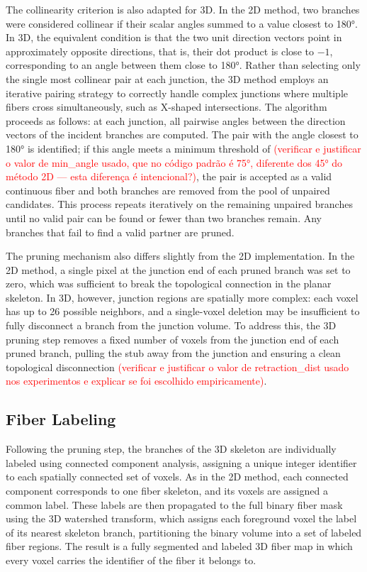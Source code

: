The collinearity criterion is also adapted for 3D. In the 2D method, two branches were considered collinear if their scalar angles summed to a value closest to 180°. In 3D, the equivalent condition is that the two unit direction vectors point in approximately opposite directions, that is, their dot product is close to $-1$, corresponding to an angle between them close to 180°. Rather than selecting only the single most collinear pair at each junction, the 3D method employs an iterative pairing strategy to correctly handle complex junctions where multiple fibers cross simultaneously, such as X-shaped intersections. The algorithm proceeds as follows: at each junction, all pairwise angles between the direction vectors of the incident branches are computed. The pair with the angle closest to 180° is identified; if this angle meets a minimum threshold of \textcolor{red}{(verificar e justificar o valor de min\_angle usado, que no código padrão é 75°, diferente dos 45° do método 2D --- esta diferença é intencional?)}, the pair is accepted as a valid continuous fiber and both branches are removed from the pool of unpaired candidates. This process repeats iteratively on the remaining unpaired branches until no valid pair can be found or fewer than two branches remain. Any branches that fail to find a valid partner are pruned.

The pruning mechanism also differs slightly from the 2D implementation. In the 2D method, a single pixel at the junction end of each pruned branch was set to zero, which was sufficient to break the topological connection in the planar skeleton. In 3D, however, junction regions are spatially more complex: each voxel has up to 26 possible neighbors, and a single-voxel deletion may be insufficient to fully disconnect a branch from the junction volume. To address this, the 3D pruning step removes a fixed number of voxels from the junction end of each pruned branch, pulling the stub away from the junction and ensuring a clean topological disconnection \textcolor{red}{(verificar e justificar o valor de retraction\_dist usado nos experimentos e explicar se foi escolhido empiricamente)}.

\subsection{Fiber Labeling}

Following the pruning step, the branches of the 3D skeleton are individually labeled using connected component analysis, assigning a unique integer identifier to each spatially connected set of voxels. As in the 2D method, each connected component corresponds to one fiber skeleton, and its voxels are assigned a common label. These labels are then propagated to the full binary fiber mask using the 3D watershed transform, which assigns each foreground voxel the label of its nearest skeleton branch, partitioning the binary volume into a set of labeled fiber regions. The result is a fully segmented and labeled 3D fiber map in which every voxel carries the identifier of the fiber it belongs to.

\clearpage